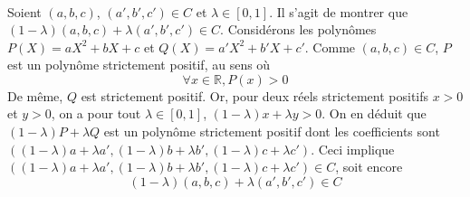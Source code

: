 \documentclass{report}
\begin{document}
\subsection{} \noindent\fbox{
\parbox{\linewidth}{

}}\\ 
\\ 
\\
\noindent

\subsection{} \noindent\fbox{
\parbox{\linewidth}{

}}\\ 
\\ 
\\
\noindent

\subsection{} \noindent{}\\ 
\\ 
\\
\noindent Soient $(a,b,c)$, $(a',b',c')\in C$ et $\lambda \in [0,1]$.\newline
 Il s'agit de montrer que $(1-\lambda)(a,b,c) + \lambda(a',b',c')\in C$.\newline
 Considérons les polynômes $P(X)=aX^2 + bX + c$ et $Q(X)=a'X^2 + b'X + c'$. Comme $(a,b,c)\in C$, $P$ est un polynôme strictement positif, au sens où $$\forall x \in \mathbb R, P(x)>0$$
 De même, $Q$ est strictement positif.\newline \newline
 Or, pour deux réels strictement positifs $x>0$ et $y>0$, on a pour tout $\lambda \in [0,1]$, $(1-\lambda)x +\lambda y>0$. \newline \newline
 On en déduit que $(1-\lambda)P +\lambda Q$ est un polynôme strictement positif dont les coefficients  sont $((1-\lambda)a+\lambda a',(1-\lambda)b+\lambda b',(1-\lambda)c+\lambda c')$.\newline
 Ceci implique $((1-\lambda)a+\lambda a',(1-\lambda)b+\lambda b',(1-\lambda)c+\lambda c')\in C$, soit encore $$(1-\lambda)(a,b,c) + \lambda(a',b',c')\in C$$
\end{document}
